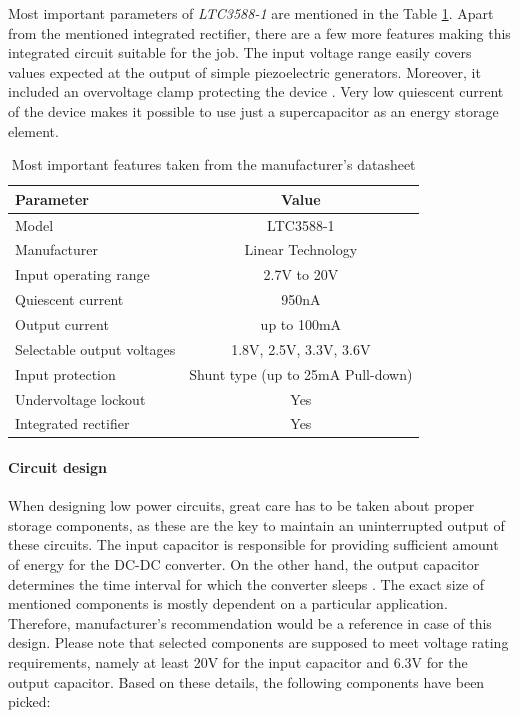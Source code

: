 \documentclass[12pt,a4paper]{article}
\begin{document}
\par

Most important parameters of \textit{LTC3588-1} are mentioned in the Table \ref{tab:ltc3588_params}. Apart from the mentioned integrated rectifier, there are a few more features making this integrated circuit suitable for the job.  The input voltage range easily covers values expected at the output of simple piezoelectric generators. Moreover, it included an overvoltage clamp protecting the device \cite{ltc3588_params}. Very low quiescent current of the device makes it possible to use just a supercapacitor as an energy storage element.

\begin{table}[ht!]
\begin{tabular}{|l|c|}
\hline
\textbf{Parameter}	& \textbf{Value} 	\\ \hline
Model  				& LTC3588-1       \\ \hline
Manufacturer    	& Linear Technology	\\ \hline
Input operating range      &  2.7V to 20V 		\\ \hline
Quiescent current     &  950nA			\\ \hline
Output current        &  up to 100mA			\\ \hline
Selectable output voltages & 1.8V, 2.5V, 3.3V, 3.6V\\ \hline
Input protection &  Shunt type (up to 25mA Pull-down)\\ \hline
Undervoltage lockout 	&  Yes 		\\ \hline
Integrated rectifier 	&  Yes 		\\ \hline
\end{tabular}
\caption{Most important features taken from the manufacturer's datasheet \cite{ltc3588_params}}
\label{tab:ltc3588_params}
\end{table}
\par

\paragraph{Circuit design}
When designing low power circuits, great care has to be taken about proper storage components, as these are the key to maintain an uninterrupted output of these circuits. The input capacitor is responsible for providing sufficient amount of energy for the DC-DC converter. On the other hand, the output capacitor determines the time interval for which the converter sleeps \cite{ltc3588_params}. The exact size of mentioned components is mostly dependent on a particular application. Therefore, manufacturer's recommendation would be a reference in case of this design. Please note that selected components are supposed to meet voltage rating requirements, namely at least 20V for the input capacitor and 6.3V for the output capacitor. Based on these details, the following components have been picked:
\end{document}
